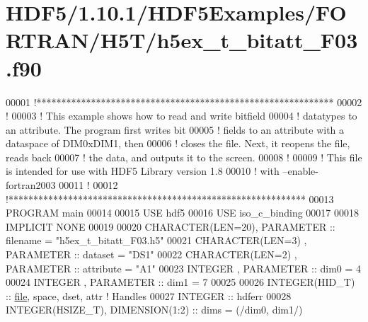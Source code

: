\hypertarget{_h_d_f5_21_810_81_2_h_d_f5_examples_2_f_o_r_t_r_a_n_2_h5_t_2h5ex__t__bitatt___f03_8f90_source}{}\section{H\+D\+F5/1.10.1/\+H\+D\+F5\+Examples/\+F\+O\+R\+T\+R\+A\+N/\+H5\+T/h5ex\+\_\+t\+\_\+bitatt\+\_\+\+F03.f90}
\label{_h_d_f5_21_810_81_2_h_d_f5_examples_2_f_o_r_t_r_a_n_2_h5_t_2h5ex__t__bitatt___f03_8f90_source}

\begin{DoxyCode}
00001 \textcolor{comment}{!************************************************************}
00002 \textcolor{comment}{!}
00003 \textcolor{comment}{!  This example shows how to read and write bitfield}
00004 \textcolor{comment}{!  datatypes to an attribute.  The program first writes bit}
00005 \textcolor{comment}{!  fields to an attribute with a dataspace of DIM0xDIM1, then}
00006 \textcolor{comment}{!  closes the file.  Next, it reopens the file, reads back}
00007 \textcolor{comment}{!  the data, and outputs it to the screen.}
00008 \textcolor{comment}{!}
00009 \textcolor{comment}{!  This file is intended for use with HDF5 Library version 1.8}
00010 \textcolor{comment}{!  with --enable-fortran2003}
00011 \textcolor{comment}{!}
00012 \textcolor{comment}{!************************************************************}
00013 \textcolor{keyword}{PROGRAM} main
00014 
00015   \textcolor{keywordtype}{USE }hdf5
00016   \textcolor{keywordtype}{USE }iso\_c\_binding
00017   
00018   \textcolor{keywordtype}{IMPLICIT NONE}
00019 
00020   \textcolor{keywordtype}{CHARACTER(LEN=20)}, \textcolor{keywordtype}{PARAMETER} :: filename  = \textcolor{stringliteral}{"h5ex\_t\_bitatt\_F03.h5"}
00021   \textcolor{keywordtype}{CHARACTER(LEN=3)} , \textcolor{keywordtype}{PARAMETER} :: dataset   = \textcolor{stringliteral}{"DS1"}
00022   \textcolor{keywordtype}{CHARACTER(LEN=2)} , \textcolor{keywordtype}{PARAMETER} :: attribute = \textcolor{stringliteral}{"A1"}
00023   \textcolor{keywordtype}{INTEGER}          , \textcolor{keywordtype}{PARAMETER} :: dim0      = 4
00024   \textcolor{keywordtype}{INTEGER}          , \textcolor{keywordtype}{PARAMETER} :: dim1      = 7
00025 
00026   \textcolor{keywordtype}{INTEGER(HID\_T)}  :: \hyperlink{structfile}{file}, space, dset, attr \textcolor{comment}{! Handles}
00027   \textcolor{keywordtype}{INTEGER} :: hdferr
00028   \textcolor{keywordtype}{INTEGER(HSIZE\_T)}, \textcolor{keywordtype}{DIMENSION(1:2)}   :: dims = (/dim0, dim1/)

\end{DoxyCode}
